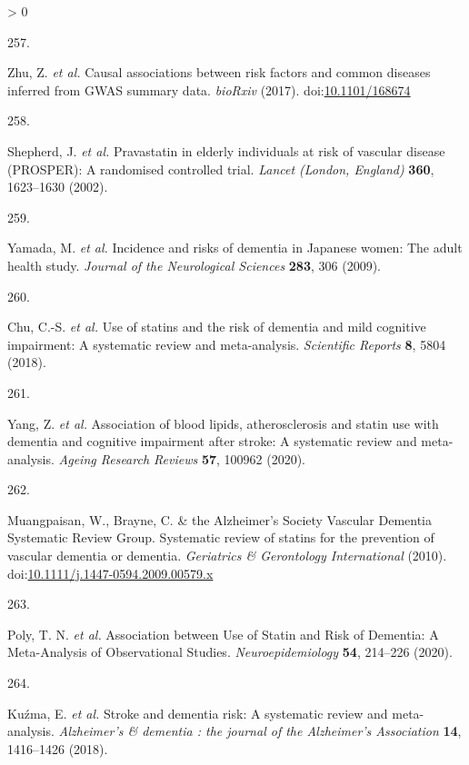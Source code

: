 \documentclass[a4paper, twoside]{templates/ociamthesis}
\newlength{\cslhangindent}
\newlength{\csllabelwidth}
\newenvironment{CSLReferences}[3] %
 {%
  \setlength{\parindent}{0pt}
  \ifodd #1 \everypar{\setlength{\hangindent}{\cslhangindent}}\ignorespaces\fi
  \ifnum #2 > 0
  \setlength{\parskip}{#2\baselineskip}
  \fi
 }%
 {}
\newcommand{\CSLLeftMargin}[1]{\parbox[t]{\maxof{\widthof{#1}}{\csllabelwidth}}{#1}}
\newcommand{\CSLRightInline}[1]{\parbox[t]{\linewidth - \csllabelwidth}{#1}}
\begin{document}
\begin{CSLReferences}{0}{0}
\leavevmode\hypertarget{ref-zhu2017}{}%
\CSLLeftMargin{257. }
\CSLRightInline{Zhu, Z. \emph{et al.} Causal associations between risk factors and common diseases inferred from {GWAS} summary data. \emph{bioRxiv} (2017). doi:\href{https://doi.org/10.1101/168674}{10.1101/168674}}

\leavevmode\hypertarget{ref-shepherd2002}{}%
\CSLLeftMargin{258. }
\CSLRightInline{Shepherd, J. \emph{et al.} Pravastatin in elderly individuals at risk of vascular disease ({PROSPER}): A randomised controlled trial. \emph{Lancet (London, England)} \textbf{360}, 1623--1630 (2002).}

\leavevmode\hypertarget{ref-yamada2009conf}{}%
\CSLLeftMargin{259. }
\CSLRightInline{Yamada, M. \emph{et al.} Incidence and risks of dementia in {Japanese} women: The adult health study. \emph{Journal of the Neurological Sciences} \textbf{283}, 306 (2009).}

\leavevmode\hypertarget{ref-chu2018}{}%
\CSLLeftMargin{260. }
\CSLRightInline{Chu, C.-S. \emph{et al.} Use of statins and the risk of dementia and mild cognitive impairment: A systematic review and meta-analysis. \emph{Scientific Reports} \textbf{8}, 5804 (2018).}

\leavevmode\hypertarget{ref-yang2020}{}%
\CSLLeftMargin{261. }
\CSLRightInline{Yang, Z. \emph{et al.} Association of blood lipids, atherosclerosis and statin use with dementia and cognitive impairment after stroke: A systematic review and meta-analysis. \emph{Ageing Research Reviews} \textbf{57}, 100962 (2020).}

\leavevmode\hypertarget{ref-muangpaisan2010}{}%
\CSLLeftMargin{262. }
\CSLRightInline{Muangpaisan, W., Brayne, C. \& the Alzheimer's Society Vascular Dementia Systematic Review Group. Systematic review of statins for the prevention of vascular dementia or dementia. \emph{Geriatrics \& Gerontology International} (2010). doi:\href{https://doi.org/10.1111/j.1447-0594.2009.00579.x}{10.1111/j.1447-0594.2009.00579.x}}

\leavevmode\hypertarget{ref-poly2020}{}%
\CSLLeftMargin{263. }
\CSLRightInline{Poly, T. N. \emph{et al.} Association between {Use} of {Statin} and {Risk} of {Dementia}: A {Meta}-{Analysis} of {Observational Studies}. \emph{Neuroepidemiology} \textbf{54}, 214--226 (2020).}

\leavevmode\hypertarget{ref-kuzma2018stroke}{}%
\CSLLeftMargin{264. }
\CSLRightInline{Kuźma, E. \emph{et al.} Stroke and dementia risk: A systematic review and meta-analysis. \emph{Alzheimer's \& dementia : the journal of the Alzheimer's Association} \textbf{14}, 1416--1426 (2018).}


\end{CSLReferences}
\end{document}

